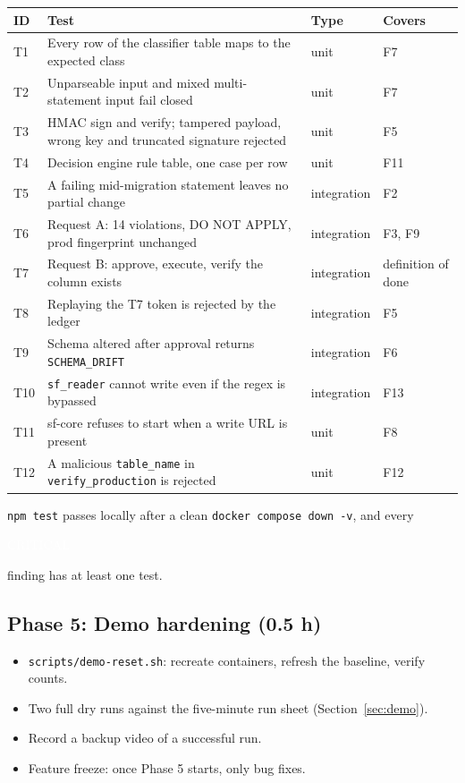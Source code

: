 \documentclass[11pt,a4paper]{article}
\newcommand{\fp}[1]{\nolinkurl{#1}}  %
\newcommand{\sev}[2]{\colorbox{#1}{\textcolor{white}{\sffamily\scriptsize\bfseries\strut #2}}}
\newcommand{\crit}{\sev{sfred}{CRITICAL}}
\begin{document}
\begin{longtable}{@{}L{0.9cm}L{8.0cm}L{2.2cm}L{3.4cm}@{}}
\toprule
\sffamily\bfseries ID & \sffamily\bfseries Test & \sffamily\bfseries Type & \sffamily\bfseries Covers \\
\midrule
\endhead
T1 & Every row of the classifier table maps to the expected class & unit & F7 \\
T2 & Unparseable input and mixed multi-statement input fail closed & unit & F7 \\
T3 & HMAC sign and verify; tampered payload, wrong key and truncated signature rejected & unit & F5 \\
T4 & Decision engine rule table, one case per row & unit & F11 \\
T5 & A failing mid-migration statement leaves no partial change & integration & F2 \\
T6 & Request A: 14 violations, DO NOT APPLY, prod fingerprint unchanged & integration & F3, F9 \\
T7 & Request B: approve, execute, verify the column exists & integration & definition of done \\
T8 & Replaying the T7 token is rejected by the ledger & integration & F5 \\
T9 & Schema altered after approval returns \fp{SCHEMA_DRIFT} & integration & F6 \\
T10 & \fp{sf_reader} cannot write even if the regex is bypassed & integration & F13 \\
T11 & sf-core refuses to start when a write URL is present & unit & F8 \\
T12 & A malicious \fp{table_name} in \fp{verify_production} is rejected & unit & F12 \\
\bottomrule
\end{longtable}

\begin{acceptbox}
\texttt{npm test} passes locally after a clean \texttt{docker compose down -v}, and every
\crit{} finding has at least one test.
\end{acceptbox}

\subsection{Phase 5: Demo hardening (0.5 h)}
\label{sec:p5}

\begin{itemize}[leftmargin=*]
  \item \fp{scripts/demo-reset.sh}: recreate containers, refresh the baseline, verify counts.
  \item Two full dry runs against the five-minute run sheet (Section~\ref{sec:demo}).
  \item Record a backup video of a successful run.
  \item Feature freeze: once Phase 5 starts, only bug fixes.
\end{itemize}
\end{document}
